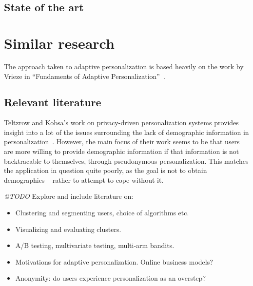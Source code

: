 \subsection{State of the art}




\section{Similar research} %
\label{sec:similar_applications}

The approach taken to adaptive personalization is based heavily on the work by Vrieze in ``Fundaments of Adaptive Personalization''~\cite{Vrieze}.

\subsection{Relevant literature} %
\label{sub:relevant_literature}

Teltzrow and Kobsa's work on privacy-driven personalization systems provides insight into a lot of the issues surrounding the lack of demographic information in personalization~\cite{Teltzrow2004,Kobsa2007}. However, the main focus of their work seems to be that users are more willing to provide demographic information if that information is not backtracable to themselves, through pseudonymous personalization.
This matches the application in question quite poorly, as the goal is not to obtain demographics -- rather to attempt to cope without it.

\emph{@TODO} Explore and include literature on:

\begin{itemize}
  \item Clustering and segmenting users, choice of algorithms etc.
  \item Visualizing and evaluating clusters.
  \item A/B testing, multivariate testing, multi-arm bandits.
  \item Motivations for adaptive personalization. Online business models?
  \item Anonymity: do users experience personalization as an overstep?
\end{itemize}


